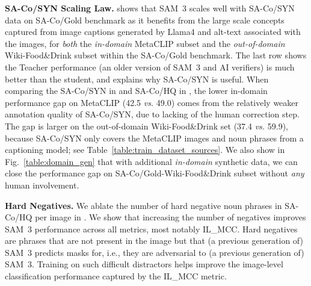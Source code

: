 \documentclass[]{fairmeta}
\newcommand{\model}{SAM~3\xspace}
\newcommand{\dsname}{{SA-Co}\xspace}
\newcommand{\trainhq}{{\dsname/HQ}\xspace}
\newcommand{\trainsyn}{{\dsname/SYN}\xspace}
\newcommand{\evalgold}{{\dsname/Gold}\xspace}
\newcommand{\ilmcc}{IL\_MCC\xspace}
\renewcommand{\paragraph}[1]{%
	\noindent\textbf{#1.}\noindent\xspace%
}
\begin{document}
\paragraph{\trainsyn Scaling Law}  shows that \model scales well with \trainsyn data on \evalgold benchmark as it benefits from the large scale concepts captured from image captions generated by Llama4 and alt-text associated with the images, for \textit{both} the \textit{in-domain} MetaCLIP subset and the \textit{out-of-domain} Wiki-Food\&Drink subset within the \evalgold benchmark. The last row shows the Teacher performance (an older version of \model and AI verifiers)  is much better than the student, and explains why \trainsyn is useful.
When comparing the \trainsyn in  and \trainhq in , the lower in-domain performance gap on MetaCLIP (42.5 \textit{vs.} 49.0) comes from the relatively weaker annotation quality of \trainsyn, due to lacking of the human correction step. The gap is larger on the out-of-domain Wiki-Food\&Drink set (37.4 \textit{vs.} 59.9), because \trainsyn only covers the MetaCLIP images and noun phrases from a captioning model; see Table~\ref{table:train_dataset_sources}. 
We also show in Fig.~\ref{table:domain_gen} that with additional \emph{in-domain} synthetic data, we can close the performance gap on \evalgold-Wiki-Food\&Drink subset without \textit{any} human involvement.

\paragraph{Hard Negatives} We ablate the number of hard negative noun phrases in \trainhq per image in . We show that increasing the number of negatives improves \model performance across all metrics, most notably \ilmcc. Hard negatives are phrases that are not present in the image but that (a previous generation of) \model predicts masks for, i.e., they are adversarial to (a previous generation of) \model. Training on such difficult distractors helps improve the image-level classification performance captured by the \ilmcc metric. 
\end{document}
